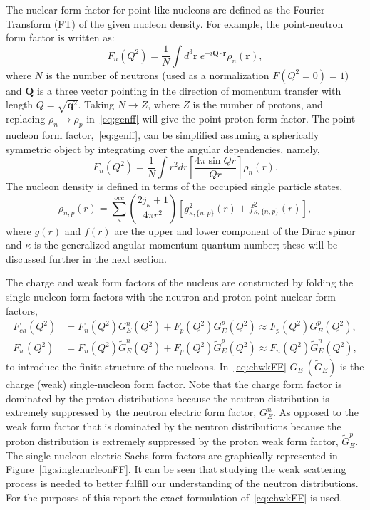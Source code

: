 The nuclear form factor for point-like nucleons are defined as the Fourier Transform (FT) of the given nucleon density. For example, the point-neutron form factor is written as:
\begin{equation}\label{eq:genff}
F_n(Q^2) = \frac{1}{N}\int d^3\mathbf{r}\ e^{-i\mathbf{Q\cdot r}}\rho _n(\mathbf{r}), 
\end{equation}
where $N$ is the number of neutrons (used as a normalization $F(Q^2=0)=1$) and $\mathbf{Q}$ is a three vector pointing in the direction of momentum transfer with length $Q=\sqrt{\mathbf{q}^2}$. Taking $N\rightarrow Z$, where $Z$ is the number of protons, and replacing $\rho _n\rightarrow \rho _p$ in~\eqref{eq:genff} will give the point-proton form factor. The point-nucleon form factor,~\eqref{eq:genff}, can be simplified assuming a spherically symmetric object by integrating over the angular dependencies, namely,  
\begin{equation}\label{eq:pointnuclearff}
F_n(Q^2)=\frac{1}{N}\int r^2 dr\left[ \frac{4\pi \sin Qr}{Qr}\right] \rho _n(r).
\end{equation}
The nucleon density is defined in terms of the occupied single particle states,
\begin{equation}\label{eq:nuclearden}
\rho _{n,p}(r)= \sum^{occ}_{\kappa} \left( \frac{2j_{\kappa} + 1}{4\pi r^2} \right) [g_{\kappa,\lbrace n,p\rbrace}^2(r)+f_{\kappa,\lbrace n,p\rbrace}^2(r)],
\end{equation}
where $g(r)$ and $f(r)$ are the upper and lower component of the Dirac spinor and $\kappa$ is the generalized angular momentum quantum number; these will be discussed further in the next section.

The charge and weak form factors of the nucleus are constructed by folding the single-nucleon form factors with the neutron and proton point-nuclear form factors,
\begin{equation}\label{eq:chwkFF}
\begin{aligned}
F_{ch}(Q^2) &= F_n(Q^2)G_E^n(Q^2) + F_p(Q^2)G_E^p(Q^2) \approx F_p(Q^2)G_E^p(Q^2), 
\\
F_{w}(Q^2) &= F_n(Q^2)\widetilde{G}_E^n(Q^2) + F_p(Q^2)\widetilde{G}_E^p(Q^2) \approx F_n(Q^2)\widetilde{G}_E^n(Q^2),
\end{aligned}
\end{equation}
to introduce the finite structure of the nucleons. In~\eqref{eq:chwkFF} $G_E\ (\widetilde{G}_E)$ is the charge (weak) single-nucleon form factor. Note that the charge form factor is dominated by the proton distributions because the neutron distribution is extremely suppressed by the neutron electric form factor, $G_E^n$. As opposed to the weak form factor that is dominated by the neutron distributions because the proton distribution is extremely suppressed by the proton weak form factor, $\widetilde{G}_E^p$. The single nucleon electric Sachs form factors are graphically represented in Figure~\ref{fig:singlenucleonFF}. It can be seen that studying the weak scattering process is needed to better fulfill our understanding of the neutron distributions. For the purposes of this report the exact formulation of~\eqref{eq:chwkFF} is used. 

